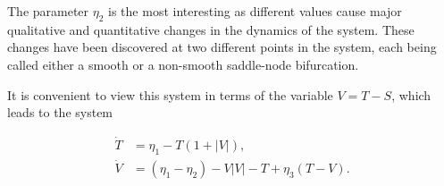 The parameter $\eta_2$ is the most interesting as different values cause major qualitative and quantitative changes in the dynamics of the system. These changes have been discovered at two different points in the system, each being called either a smooth or a non-smooth saddle-node bifurcation.

It is convenient to view this system in terms of the variable $V=T-S$, which leads to the system

\begin{equation}\label{eq:basic_stommel}
 \begin{aligned}
  \dot{T} & = \eta_1-T(1+|V|), \\
  \dot{V}   & = (\eta_1-\eta_2)-V|V|-T+\eta_3(T-V).
 \end{aligned}
\end{equation}

